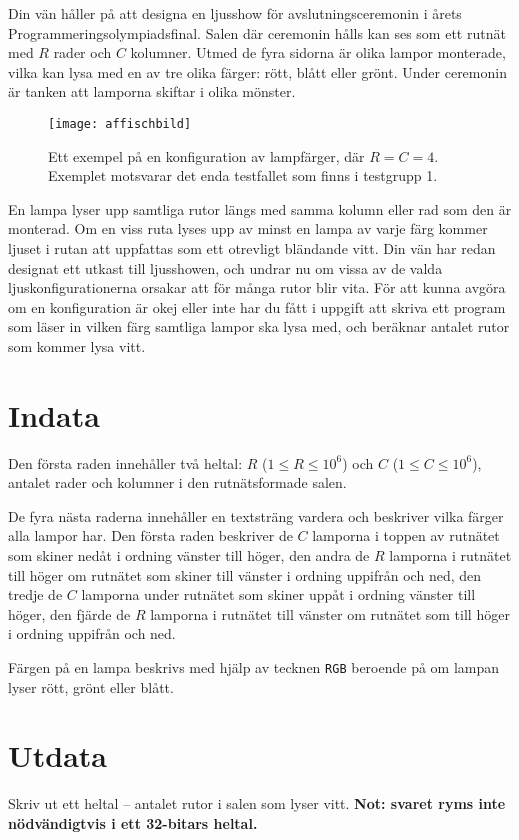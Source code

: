 Din vän håller på att designa en ljusshow för avslutningsceremonin i årets Programmeringsolympiadsfinal.
Salen där ceremonin hålls kan ses som ett rutnät med $R$ rader och $C$ kolumner.
Utmed de fyra sidorna är olika lampor monterade, vilka kan lysa med en av tre olika färger: rött, blått eller grönt.
Under ceremonin är tanken att lamporna skiftar i olika mönster.

\begin{figure}[h]
    \centering
    \texttt{[image: affischbild]}
    \caption{Ett exempel på en konfiguration av lampfärger, där $R = C = 4$. Exemplet motsvarar det enda testfallet som finns i testgrupp 1.}
\end{figure}

En lampa lyser upp samtliga rutor längs med samma kolumn eller rad som den är monterad.
Om en viss ruta lyses upp av minst en lampa av varje färg kommer ljuset i rutan att uppfattas som ett otrevligt bländande vitt.
Din vän har redan designat ett utkast till ljusshowen, och undrar nu om vissa av de valda ljuskonfigurationerna orsakar att för många rutor blir vita.
För att kunna avgöra om en konfiguration är okej eller inte har du fått i uppgift att skriva ett program som läser in vilken färg samtliga lampor ska lysa med, och beräknar antalet rutor som kommer lysa vitt.

\section*{Indata}
Den första raden innehåller två heltal: $R$ ($1 \le R \le 10^6$) och $C$ ($1 \le C \le 10^6$), antalet rader och kolumner i den rutnätsformade salen.

De fyra nästa raderna innehåller en textsträng vardera och beskriver vilka färger alla lampor har.
Den första raden beskriver de $C$ lamporna i toppen av rutnätet som skiner nedåt i ordning vänster till höger,
    den andra de $R$ lamporna i rutnätet till höger om rutnätet som skiner till vänster i ordning uppifrån och ned,
    den tredje de $C$ lamporna under rutnätet som skiner uppåt i ordning vänster till höger,
    den fjärde de $R$ lamporna i rutnätet till vänster om rutnätet som till höger i ordning uppifrån och ned.

Färgen på en lampa beskrivs med hjälp av tecknen \texttt{RGB} beroende på om lampan lyser rött, grönt eller blått.

\section*{Utdata}
Skriv ut ett heltal -- antalet rutor i salen som lyser vitt.
\textbf{Not: svaret ryms inte nödvändigtvis i ett 32-bitars heltal.}

